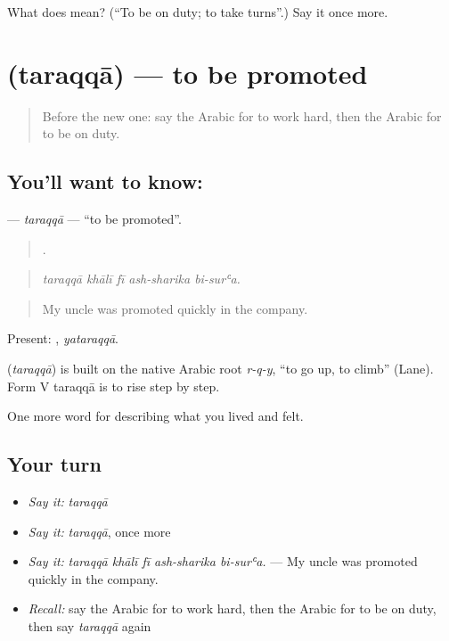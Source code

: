 \begin{tcolorbox}[breakable,colback=teal!4,colframe=teal!35!black,title={Before you move on}]
What does  mean? (\textquotedblleft{}To be on duty; to take turns\textquotedblright{}.) Say it once more.
\end{tcolorbox}
\section[\texorpdfstring{\ar{ترقى} (taraqqā)}{ترقى (taraqqā)}]{ (taraqqā) — to be promoted}

\label{lesson:AR-C524-taraqqa}



\begin{quote}
Before the new one: say the Arabic for to work hard, then the Arabic for to be on duty.
\end{quote}

\subsection*{You'll want to know: }
\textbf{} — \emph{taraqqā} — \textquotedblleft{}to be promoted\textquotedblright{}.

\begin{quote}
    .
\end{quote}

\begin{quote}
\emph{taraqqā khālī fī ash-sharika bi-surʿa.}
\end{quote}

\begin{quote}
My uncle was promoted quickly in the company.
\end{quote}

Present: , \emph{yataraqqā}.

\begin{cousinweb}
\textbf{} (\emph{taraqqā}) is built on the native Arabic root \emph{r-q-y}, \textquotedblleft{}to go up, to climb\textquotedblright{} (Lane). Form V taraqqā is to rise step by step.
\end{cousinweb}

\begin{grammarlens}[title={What you've built}]
One more word for describing what you lived and felt.
\end{grammarlens}

\subsection*{Your turn}
\begin{itemize}
\raggedright
  \item \emph{Say it:} \emph{taraqqā}
  \item \emph{Say it:} \emph{taraqqā}, once more
  \item \emph{Say it:} \emph{taraqqā khālī fī ash-sharika bi-surʿa.} — My uncle was promoted quickly in the company.
  \item \emph{Recall:} say the Arabic for to work hard, then the Arabic for to be on duty, then say \emph{taraqqā} again
\end{itemize}

